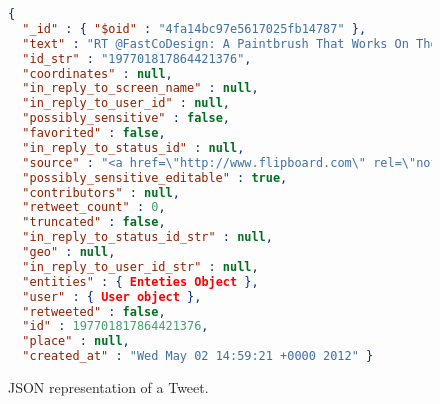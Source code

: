 \begin{figure}
  \begin{center}
    \begin{lstlisting}[language=json,firstnumber=1]
{ 
  "_id" : { "$oid" : "4fa14bc97e5617025fb14787" },
  "text" : "RT @FastCoDesign: A Paintbrush That Works On The iPad http://t.co/eWjEZAga (@sensubrushman)",
  "id_str" : "197701817864421376", 
  "coordinates" : null, 
  "in_reply_to_screen_name" : null, 
  "in_reply_to_user_id" : null,
  "possibly_sensitive" : false, 
  "favorited" : false, 
  "in_reply_to_status_id" : null, 
  "source" : "<a href=\"http://www.flipboard.com\" rel=\"nofollow\">Flipboard</a>", 
  "possibly_sensitive_editable" : true, 
  "contributors" : null, 
  "retweet_count" : 0, 
  "truncated" : false,
  "in_reply_to_status_id_str" : null,
  "geo" : null,
  "in_reply_to_user_id_str" : null,
  "entities" : { Enteties Object },
  "user" : { User object },
  "retweeted" : false,
  "id" : 197701817864421376,
  "place" : null,
  "created_at" : "Wed May 02 14:59:21 +0000 2012" }

    \end{lstlisting}
  \end{center}
  \caption{\ac{JSON} representation of a Tweet.}
  \label{fig:json_tweet}
\end{figure}


